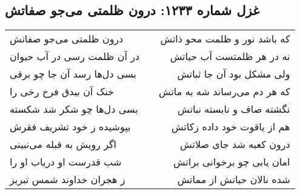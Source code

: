 \begin{center}
\section*{غزل شماره ۱۲۳۳: درون ظلمتی می‌جو صفاتش}
\label{sec:1233}
\begin{longtable}{l p{0.5cm} r}
درون ظلمتی می‌جو صفاتش
&&
که باشد نور و ظلمت محو ذاتش
\\
در آن ظلمت رسی در آب حیوان
&&
نه در هر ظلمتست آب حیاتش
\\
بسی دل‌ها رسد آن جا چو برقی
&&
ولی مشکل بود آن جا ثباتش
\\
خنک آن بیدق فرخ رخی را
&&
که هر دم می‌رساند شه به ماتش
\\
بسی دل‌ها چو شکر شد شکسته
&&
نگشته صاف و نابسته نباتش
\\
بپوشیده ز خود تشریف فقرش
&&
هم از یاقوت خود داده زکاتش
\\
اگر رویش به قبله می‌نبینی
&&
درون کعبه شد جای صلاتش
\\
شب قدرست او دریاب او را
&&
امان یابی چو برخوانی براتش
\\
ز هجران خداوند شمس تبریز
&&
شده نالان حیاتش از مماتش
\\
\end{longtable}
\end{center}
